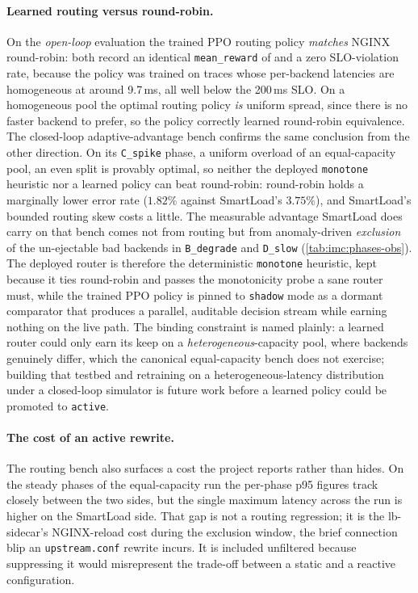 \paragraph{Learned routing versus round-robin.} On the \emph{open-loop} evaluation
the trained PPO routing policy \emph{matches} NGINX round-robin: both record an
identical \texttt{mean\_reward} of \BMrlPpoReward{} and a zero SLO-violation rate,
because the policy was trained on traces whose per-backend latencies are homogeneous
at around 9.7\,ms, all well below the 200\,ms SLO. On a homogeneous pool the optimal
routing policy \emph{is} uniform spread, since there is no faster backend to prefer, so
the policy correctly learned round-robin equivalence. The closed-loop
adaptive-advantage bench confirms the same conclusion from the other direction. On its
\texttt{C\_spike} phase, a uniform overload of an equal-capacity pool, an even split is
provably optimal, so neither the deployed \texttt{monotone} heuristic nor a learned
policy can beat round-robin: round-robin holds a marginally lower error rate ($1.82\%$
against SmartLoad's $3.75\%$), and SmartLoad's bounded routing skew costs a little. The
measurable advantage SmartLoad does carry on that bench comes not from routing but from
anomaly-driven \emph{exclusion} of the un-ejectable bad backends in \texttt{B\_degrade}
and \texttt{D\_slow} (\cref{tab:imc:phases-obs}). The deployed router is therefore the
deterministic \texttt{monotone} heuristic, kept because it ties round-robin and passes
the monotonicity probe a sane router must, while the trained PPO policy is pinned to
\texttt{shadow} mode as a dormant comparator that produces a parallel, auditable
decision stream while earning nothing on the live path. The binding constraint is named
plainly: a learned router could only earn its keep on a \emph{heterogeneous}-capacity
pool, where backends genuinely differ, which the canonical equal-capacity bench does not
exercise; building that testbed and retraining on a heterogeneous-latency distribution
under a closed-loop simulator is future work before a learned policy could be promoted
to \texttt{active}.

\paragraph{The cost of an active rewrite.} The routing bench also surfaces a cost the
project reports rather than hides. On the steady phases of the equal-capacity run the
per-phase p95 figures track closely between the two sides, but the single maximum
latency across the run is higher on the SmartLoad side. That gap is not a routing
regression; it is the lb-sidecar's NGINX-reload cost during the exclusion window, the
brief connection blip an \texttt{upstream.conf} rewrite incurs. It is included unfiltered because suppressing it
would misrepresent the trade-off between a static and a reactive configuration.


